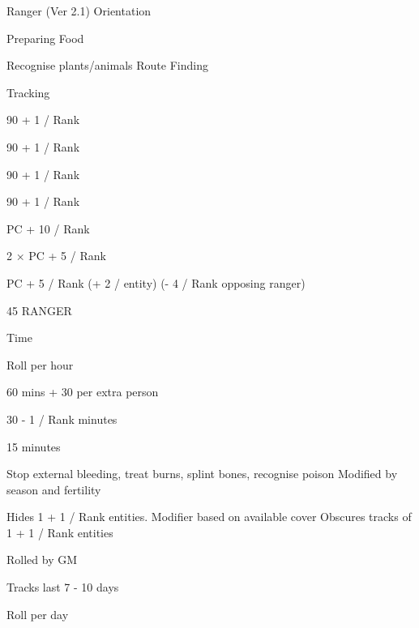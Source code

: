 \begin{Chapter}{Ranger (Ver 2.1)}
Orientation 

Preparing Food 

Recognise 
plants/animals 
Route Finding 

Tracking 

 

90 + 1 / Rank 

90 + 1 / Rank 

90 + 1 / Rank 

90 + 1 / Rank 

PC + 10 / Rank 

2 × PC + 5 / Rank 

PC + 5 / Rank (+ 2 / entity) (- 4 / Rank opposing 
ranger) 

 

45 RANGER 

Time 

 

 

 

 

Roll per hour 

 

60 mins + 30 per extra 
person 
 

30 - 1 / Rank minutes 

15 minutes 

 

 

 

 

 

 

Stop external bleeding, treat 
burns, splint bones, recognise poison 
Modified by season and fertility 

Hides 1 + 1 / Rank entities. Modifier based on available 
cover 
Obscures tracks of 1 + 1 / Rank 
entities 
 

 

 

 

 

Rolled by GM 

Tracks last 7 - 10 days 

Roll per day 

\end{Chapter}
